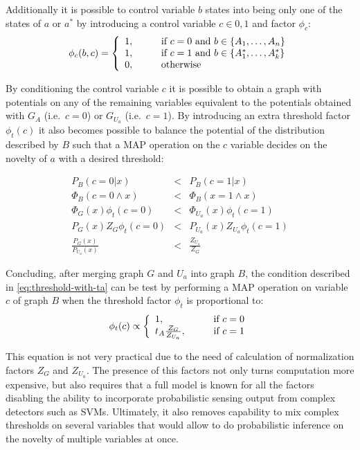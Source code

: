 Additionally it is possible to control variable $b$ states into being only one
of the states of $a$ or $a^*$ by introducing a control variable $c \in {0, 1}$
and factor $\phi_{c}$:
\[
\phi_{c}(b, c) = \left\{
  \begin{array}{l l}
    1, & \qquad \text{if } c = 0 \text{ and } b \in \{A_1,\dotsc,A_n\} \\
    1, & \qquad \text{if } c = 1 \text{ and } b \in \{A^*_1,\dotsc,A^*_k\}\\
    0, & \qquad \text{otherwise}
  \end{array} \right.
\]

By conditioning the control variable $c$ it is possible to obtain a graph with
potentials on any of the remaining variables equivalent to the potentials
obtained with $G_A$ (i.e.\ $c=0$) or $G_{U_a}$ (i.e.\ $c=1$). By introducing
an extra threshold factor $\phi_t(c)$ it also becomes possible to balance the
potential of the distribution described by $B$ such that a \gls{MAP} operation
on the $c$ variable decides on the novelty of $a$ with a desired threshold:

\begin{eqnarray*}
 P_B(c=0 | x)         &<& P_B(c=1 | x) \\
\Phi_B(c=0 \land x)   &<& \Phi_B(x=1 \land x) \\
\Phi_G(x) \phi_t(c=0) &<& \Phi_{U_a}(x) \phi_t(c=1) \\
P_G(x) Z_G \phi_t(c=0) &<& P_{U_a}(x) Z_{U_a} \phi_t(c=1) \\
\frac{P_G(x)}{P_{U_a}(x)} &<& \frac{Z_{U_a}}{Z_G}
\end{eqnarray*}

Concluding, after merging graph $G$ and $U_a$ into graph $B$, the condition
described in \autoref{eq:threshold-with-ta} can be test by performing a
\gls{MAP} operation on variable $c$ of graph $B$ when the threshold factor
$\phi_t$ is proportional to:
\begin{equation}
\label{eq:structure-ratio}
\phi_t(c) \propto \left\{
  \begin{array}{l l}
    1, & \qquad \text{if } c = 0 \\
    t_A \frac{Z_G}{Z_{U_a}}, & \qquad \text{if } c = 1\\
  \end{array} \right.
\end{equation}

This equation is not very practical due to the need of calculation of
normalization factors $Z_G$ and $Z_{U_a}$. The presence of this factors
not only turns computation more expensive, but also requires that a full model
is known for all the factors disabling the ability to incorporate probabilistic
sensing output from complex detectors such as \glspl{SVM}. Ultimately, it also
removes capability to mix complex thresholds on several variables that would
allow to do probabilistic inference on the novelty of multiple variables at once.

